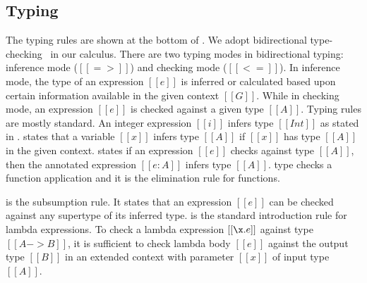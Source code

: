 \subsection{Typing}
\label{sec:union:typ}
The typing rules are shown at the bottom of .
We adopt bidirectional type-checking~\cite{} in our calculus.  There
are two typing modes in bidirectional typing: inference mode
($[[=>]]$) and checking mode ($[[<=]]$). In inference mode, the type of
an expression $[[e]]$ is inferred or calculated based upon certain
information available in the given context $[[G]]$.  While in checking
mode, an expression $[[e]]$ is checked against a given type $[[A]]$.
Typing rules are mostly standard. An integer
expression $[[i]]$ infers type $[[Int]]$ as stated in .
 states that a variable $[[x]]$ infers type $[[A]]$ if
$[[x]]$ has type $[[A]]$ in the given context.  states
if an expression $[[e]]$ checks against type $[[A]]$, then the
annotated expression $[[e:A]]$ infers type $[[A]]$.
 type checks a function application and it is the
elimination rule for functions.
\begin{comment}
Expression $[[e1]]$ has to
be a function expression and expression $[[e2]]$ has to check against
input type of $[[e1]]$.  An important point to notice in
\rref{typ-app} is $[[e1]]$ infers type $[[A -> B]]$. This may look
weird at the very first glance because lamda expressions ($[[\x.e]]$)
are not annotated in program expressions $[[e]]$ and it seems not
possible for lambda expression to infer its type.  To answer this
question, we emphasize the use of partial expressions $[[p]]$ and
values $[[v]]$.  Lambda expression is annotated in $[[p]]$ and so in
$[[v]]$ because values are defined as annotated partial expressions.
\end{comment}
 is the subsumption rule. It states that an expression
$[[e]]$ can be checked against any supertype of its inferred type.
 is the standard introduction rule for lambda
expressions. To check a lambda expression $[[\x.e]]$ against type $[[A
    -> B]]$, it is sufficient to check lambda body $[[e]]$ against the
output type $[[B]]$ in an extended context with parameter $[[x]]$ of
input type $[[A]]$.

